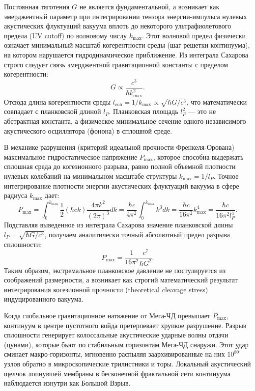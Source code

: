 \documentclass[11pt,a4paper]{article}
\begin{document}
	Постоянная тяготения $G$ не является фундаментальной, а возникает как эмерджентный параметр при интегрировании тензора энергии-импульса нулевых акустических флуктуаций вакуума вплоть до некоторого ультрафиолетового предела (UV cutoff) по волновому числу $k_{\text{max}}$. Этот волновой предел физически означает минимальный масштаб когерентности среды (шаг решетки континуума), на котором нарушается гидродинамическое приближение. 
	Из интеграла Сахарова строго следует связь эмерджентной гравитационной константы с пределом когерентности:
	\begin{equation}
		G \propto \frac{c^3}{\hbar k_{\text{max}}^2}.
	\end{equation}
	Отсюда длина когерентности среды $l_{\text{coh}} = 1/k_{\text{max}} \propto \sqrt{\hbar G / c^3}$, что математически совпадает с планковской длиной $l_P$. Планковская площадь $l_P^2$ — это не абстрактная константа, а физическое минимальное сечение одного независимого акустического осциллятора (фонона) в сплошной среде.
	
	В механике разрушения (критерий идеальной прочности Френкеля-Орована) максимальное гидростатическое напряжение $P_{\text{max}}$, которое способна выдержать сплошная среда до когезионного разрыва, равно полной объемной плотности нулевых колебаний на минимальном масштабе структуры $k_{\text{max}} = 1/l_P$.
	Точное интегрирование плотности энергии акустических флуктуаций вакуума в сфере радиуса $k_{\text{max}}$ дает:
	\begin{equation}
		P_{\text{max}} = \int_0^{k_{\text{max}}} \frac{1}{2} (\hbar c k) \frac{4\pi k^2}{(2\pi)^3} dk = \frac{\hbar c}{4\pi^2} \int_0^{k_{\text{max}}} k^3 dk = \frac{\hbar c}{16\pi^2} k_{\text{max}}^4 = \frac{\hbar c}{16\pi^2 l_P^4}.
	\end{equation}
	Подставляя выведенное из интеграла Сахарова значение планковской длины $l_P = \sqrt{\hbar G / c^3}$, получаем аналитически точный абсолютный предел разрыва сплошности:
	\begin{equation}
		P_{\text{max}} = \frac{1}{16\pi^2} \frac{c^7}{\hbar G^2}.
	\end{equation}
	Таким образом, экстремальное планковское давление не постулируется из соображений размерности, а возникает как строгий математический результат интегрирования когезионной прочности (theoretical cleavage stress) индуцированного вакуума.
	
	Когда глобальное гравитационное натяжение от Мега-ЧД превышает $P_{\text{max}}$, континуум в центре пустотного войда претерпевает хрупкое разрушение. Разрыв сплошности генерирует колоссальные акустические ударные волны отдачи (цунами), которые бьют по стабильным горизонтам Мега-ЧД снаружи. Этот удар сминает макро-горизонты, мгновенно распыляя заархивированные на них $10^{80}$ узлов обратно в микроскопические трилистники и торы. Локальный акустический щелчок лопнувшей мембраны в бесконечной фрактальной сети континуума наблюдается изнутри как Большой Взрыв.
	
\end{document}
